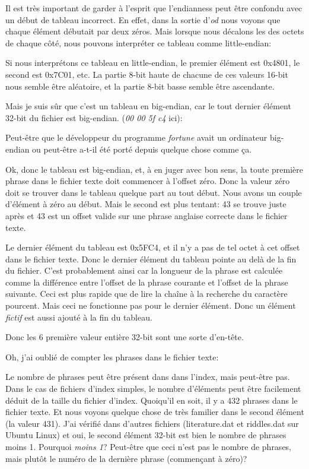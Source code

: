 Il est très important de garder à l'esprit que l'endianness peut être confondu avec
un début de tableau incorrect.
En effet, dans la sortie d'\emph{od} nous voyons que chaque élément débutait par deux
zéros.
Mais lorsque nous décalons les des octets de chaque côté, nous pouvons interpréter
ce tableau comme little-endian:



Si nous interprétons ce tableau en little-endian, le premier élément est 0x4801,
le second est 0x7C01, etc.
La partie 8-bit haute de chacune de ces valeurs 16-bit nous semble être aléatoire,
et la partie 8-bit basse semble être ascendante.

Mais je suis sûr que c'est un tableau en big-endian, car le tout dernier élément
32-bit du fichier est big-endian.
(\emph{00 00 5f c4} ici):



Peut-être que le développeur du programme \emph{fortune} avait un ordinateur big-endian
ou peut-être a-t-il été porté depuis quelque chose comme ça.

Ok, donc le tableau est big-endian, et, à en juger avec bon sens, la toute première
phrase dans le fichier texte doit commencer à l'offset zéro. Donc la valeur zéro
doit se trouver dans le tableau quelque part au tout début.
Nous avons un couple d'élément à zéro au début. Mais le second est plus tentant:
43 se trouve juste après et 43 est un offset valide sur une phrase anglaise correcte
dans le fichier texte.

Le dernier élément du tableau est 0x5FC4, et il n'y a pas de tel octet à cet offset
dans le fichier texte.
Donc le dernier élément du tableau pointe au delà de la fin du fichier.
C'est probablement ainsi car la longueur de la phrase est calculée comme la différence
entre l'offset de la phrase courante et l'offset de la phrase suivante.
Ceci est plus rapide que de lire la chaîne à la recherche du caractère pourcent.
Mais ceci ne fonctionne pas pour le dernier élément.
Donc un élément \emph{fictif} est aussi ajouté à la fin du tableau.

Donc les 6 première valeur entière 32-bit sont une sorte d'en-tête.

Oh, j'ai oublié de compter les phrases dans le fichier texte:



Le nombre de phrases peut être présent dans dans l'index, mais peut-être pas.
Dans le cas de fichiers d'index simples, le nombre d'éléments peut être facilement
déduit de la taille du fichier d'index.
Quoiqu'il en soit, il y a 432 phrases dans le fichier texte.
Et nous voyons quelque chose de très familier dans le second élément (la valeur 431).
J'ai vérifié dans d'autres fichiers (literature.dat et riddles.dat sur Ubuntu Linux)
et oui, le second élément 32-bit est bien le nombre de phrases moins 1.
Pourquoi \emph{moins 1}? Peut-être que ceci n'est pas le nombre de phrases, mais plutôt
le numéro de la dernière phrase (commençant à zéro)?

